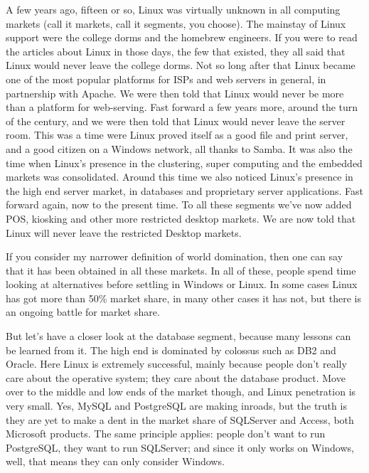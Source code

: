 \documentclass{book}
\begin{document}
A few years ago, fifteen or so, Linux was virtually unknown in all
computing markets (call it markets, call it segments, you choose). The
mainstay of Linux support were the college dorms and the homebrew
engineers. If you were to read the articles about Linux in those days,
the few that existed, they all said that Linux would never leave the
college dorms. Not so long after that Linux became one of the most
popular platforms for ISPs and web servers in general, in partnership
with Apache. We were then told that Linux would never be more than a
platform for web-serving. Fast forward a few years more, around the
turn of the century, and we were then told that Linux would never
leave the server room. This was a time were Linux proved itself as a
good file and print server, and a good citizen on a Windows network,
all thanks to Samba. It was also the time when Linux's presence in the
clustering, super computing and the embedded markets was
consolidated. Around this time we also noticed Linux's presence in the
high end server market, in databases and proprietary server
applications. Fast forward again, now to the present time. To all
these segments we've now added POS, kiosking and other more restricted
desktop markets. We are now told that Linux will never leave the
restricted Desktop markets.

If you consider my narrower definition of world domination, then one
can say that it has been obtained in all these markets. In all of
these, people spend time looking at alternatives before settling in
Windows or Linux. In some cases Linux has got more than 50\% market
share, in many other cases it has not, but there is an ongoing battle
for market share.

But let's have a closer look at the database segment, because many
lessons can be learned from it. The high end is dominated by colossus
such as DB2 and Oracle. Here Linux is extremely successful, mainly
because people don't really care about the operative system; they care
about the database product. Move over to the middle and low ends of
the market though, and Linux penetration is very small. Yes, MySQL and
PostgreSQL are making inroads, but the truth is they are yet to make a
dent in the market share of SQLServer and Access, both Microsoft
products. The same principle applies: people don't want to run
PostgreSQL, they want to run SQLServer; and since it only works on
Windows, well, that means they can only consider Windows.
\end{document}
